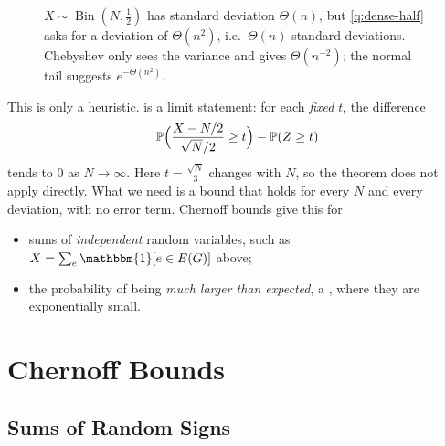 \begin{figure}[H]
    \centering
    \caption{\(X \sim \operatorname{Bin}(N, \frac{1}{2})\) has standard deviation \(\Theta(n)\), but \autoref{q:dense-half} asks for a deviation of \(\Theta(n^{2})\), i.e.\ \(\Theta(n)\) standard deviations. Chebyshev only sees the variance and gives \(\Theta(n^{-2})\); the normal tail suggests \(e^{-\Theta(n^{2})}\).}
    \label{fig:clt-tail}
\end{figure}

This is only a heuristic.  is a limit statement: for each \emph{fixed} \(t\), the difference
\[
    \mathbb{P}\Bigl( \frac{X - N/2}{\sqrt{N}/2} \ge t \Bigr) - \mathbb{P}(Z \ge t)
\]
tends to \(0\) as \(N \to \infty\). Here \(t = \frac{\sqrt{N}}{3}\) changes with \(N\), so the theorem does not apply directly. What we need is a bound that holds for every \(N\) and every deviation, with no error term. Chernoff bounds give this for
\begin{itemize}
    \item sums of \emph{independent} random variables, such as \(X = \sum_{e} \mathbbm{1}[e \in E(G)]\) above;
    \item the probability of being \emph{much larger than expected}, a , where they are exponentially small.
\end{itemize}

\section{Chernoff Bounds}\label{sec:chernoff}

\subsection{Sums of Random Signs}\label{sec:chernoff-signs}

